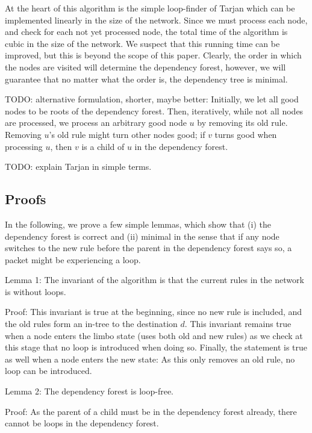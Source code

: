 At the heart of this algorithm is the simple loop-finder of Tarjan \cite{reference_1_in_http://en.wikipedia.org/wiki/Tarjan's_strongly_connected_components_algorithm} which can be implemented linearly in the size of the network. Since we must process each node, and check for each not yet processed node, the total time of the algorithm is cubic in the size of the network. We suspect that this running time can be improved, but this is beyond the scope of this paper. Clearly, the order in which the nodes are visited will determine the dependency forest, however, we will guarantee that no matter what the order is, the dependency tree is minimal.

TODO: alternative formulation, shorter, maybe better: Initially, we let all good nodes to be roots of the dependency forest. Then, iteratively, while not all nodes are processed, we process an arbitrary good node $u$ by removing its old rule. Removing $u$'s old rule might turn other nodes good; if $v$ turns good when processing $u$, then $v$ is a child of $u$ in the dependency forest.

TODO: explain Tarjan in simple terms.

\subsection{Proofs} %

In the following, we prove a few simple lemmas, which show that (i) the dependency forest is correct and (ii) minimal in the sense that if any node switches to the new rule before the parent in the dependency forest says so, a packet might be experiencing a loop.

Lemma 1: The invariant of the algorithm is that the current rules in the network is without loops.

Proof: This invariant is true at the beginning, since no new rule is included, and the old rules form an in-tree to the destination $d$. This invariant remains true when a node enters the limbo state (uses both old and new rules) as we check at this stage that no loop is introduced when doing so. Finally, the statement is true as well when a node enters the new state: As this only removes an old rule, no loop can be introduced.

Lemma 2: The dependency forest is loop-free. 

Proof: As the parent of a child must be in the dependency forest already, there cannot be loops in the dependency forest.

